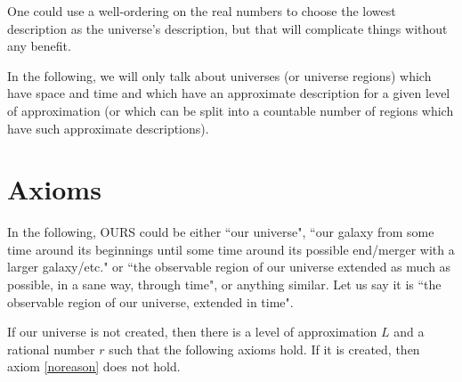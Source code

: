 \documentclass[a4paper
,draft
]{article}
\newcommand{\svn}[2][]{\todo[author=Virgil,color=red!25!white,#1]{#2}}
\newcommand{\ghilimele}[1]{``#1"}
\begin{document}
One could use a well-ordering on the real numbers to choose the lowest description as the universe's description, but that will complicate things without any benefit.

In the following, we will only talk about universes (or universe regions) which have space and time and which have an approximate description for a given level of approximation (or which can be split into a countable number of regions which have such approximate descriptions).

\section{Axioms}

In the following, OURS could be either \ghilimele{our universe}, \ghilimele{our galaxy from some time around its beginnings until some time around its possible end/merger with a larger galaxy/etc.} or \ghilimele{the observable region of our universe extended as much as possible, in a sane way, through time}, or anything similar. Let us say it is \ghilimele{the observable region of our universe, extended in time}.

If our universe is not created, then there is a level of approximation $L$ and a rational number $r$ such that the following axioms hold. If it is created, then axiom \ref{noreason} does not hold.\svn{Explain why.}
\end{document}
